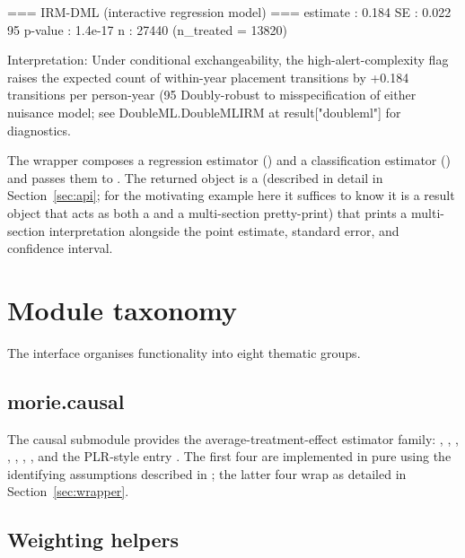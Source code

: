 \documentclass[article,shortnames,nojss]{jss}
\begin{document}
\begin{Code}
=== IRM-DML (interactive regression model) ===
  estimate : 0.184
  SE       : 0.022
  95%
  p-value  : 1.4e-17
  n        : 27440  (n_treated = 13820)

Interpretation:
  Under conditional exchangeability, the high-alert-complexity flag
  raises the expected count of within-year placement transitions
  by +0.184 transitions per person-year (95%
  Doubly-robust to misspecification of either nuisance model;
  see DoubleML.DoubleMLIRM at result["doubleml"] for diagnostics.
\end{Code}

\noindent The  wrapper composes a
 regression estimator
() and a classification estimator
() and passes them to
. The returned object is a
 (described in detail in Section~\ref{sec:api}; for the
motivating example here it suffices to know it is a result object
that acts as both a  and a multi-section pretty-print) that prints a
multi-section interpretation alongside the point estimate,
standard error, and confidence interval.

\section{Module taxonomy}
\label{sec:taxonomy}

The   interface organises
functionality into eight thematic groups.

\subsection{morie.causal}

The causal submodule provides the average-treatment-effect
estimator family:
, ,
, ,
, ,
, and the PLR-style entry
. The first four
are implemented in pure  using the identifying
assumptions described in \citet{Ruhela2026MRM}; the latter four
wrap  as detailed in Section~\ref{sec:wrapper}.

\subsection{Weighting helpers}
\end{document}
